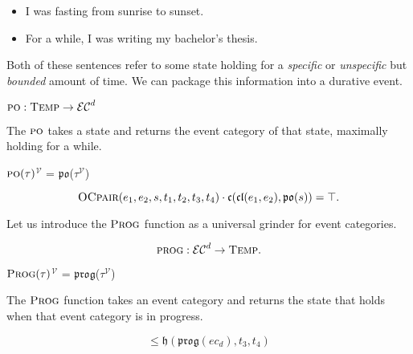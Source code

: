 \begin{itemize}
	\item I was fasting from sunrise to sunset.
	\item For a while, I was writing my bachelor's thesis.
\end{itemize}

Both of these sentences refer to some state holding for a \textit{specific} or \textit{unspecific} but \textit{bounded} amount of time. We can package this information into a durative event.

\begin{defn}
	$\textsc{po} : \textsc{Temp} \to \mathcal{EC}^d$
\end{defn}

The $\textsc{po}$ takes a state and returns the event category of that state, maximally holding for a while.

\begin{defn}
	\textlbrackdbl $\textsc{po}(\tau)$\textrbrackdbl$^{\mathcal{V}}$ = $\mathfrak{po}$(\textlbrackdbl $\tau$\textrbrackdbl$^{\mathcal{V}}$)
\end{defn}

\begin{axiom}\label{ax:po}
	\begin{equation}
		\textsc{OCpair}(e_1, e_2, s, t_1, t_2, t_3, t_4) \cdot \mathfrak{c}(\mathfrak{cl}(e_1, e_2), \mathfrak{po}(s)) = \top.
	\end{equation}
\end{axiom}

Let us introduce the $\textsc{Prog}$ function as a universal grinder for event categories.
\begin{defn}
	\begin{equation}
		\textsc{prog} : \mathcal{EC}^d \to \textsc{Temp}.
	\end{equation}
\end{defn}

\begin{defn}
	\textlbrackdbl $\textsc{Prog}(\tau)$\textrbrackdbl$^{\mathcal{V}}$
	= $\mathfrak{prog}$(\textlbrackdbl $\tau$\textrbrackdbl$^{\mathcal{V}}$)
\end{defn}

The $\textsc{Prog}$ function takes an event category and returns the state that holds when that event category is in progress.
\begin{axiom}\label{ax:prog}
	\begin{equation}
		[
			\textsc{OCpair}(e_1, e_2, s, t_1, t_2, t_3, t_4) \cdot \mathfrak{c}(\mathfrak{cl} (e_1, e_2), ec_d)
		] \leq  \mathfrak{h}(\mathfrak{prog}(ec_d), t_3, t_4)
	\end{equation}
\end{axiom}

